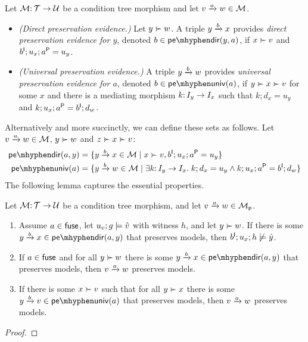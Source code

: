 \begin{definition}\label{def:preservation evidence}
Let ${\mathcal{M}}{:}\, {\mathcal{T}}\rightarrow{\mathcal{U}}$ be a condition tree morphism and let $\trip vaw\in\cM$.
\begin{itemize}[topsep=\smallskipamount]
\item \emph{(Direct preservation evidence.)} Let $y\childof w$. A triple $\trip ybx$ provides \emph{direct preservation evidence for $y$}, denoted $b\in\pedir{y,a}$, if $x\childof v$ and $b^{\mathsf I};u_x;a^{\mathsf P}=u_y$.
\item \emph{(Universal preservation evidence.)} A triple $\trip ybw$ provides \emph{universal preservation evidence for $a$}, denoted $b\in\peuniv{a}$, if $y\childof x\childof v$ for some $x$ and there is a mediating morphism $k{:}\, I_y\rightarrow I_x$ such that $k;d_x=u_y$ and $k;u_x;a^{\mathsf P}=b^{\mathsf I};d_w$.
\end{itemize}
\end{definition}
%
Alternatively and more succinctly, we can define these sets as follows. Let $\trip vaw\in\cM$, $y\childof w$ and $z\childof x\childof v$:
%
\begin{align*}
\pedir{a,y} ={} & \gensetof{\trip ybx\in \cM}{x\childof v, b\I;u_x;a\P=u_y} \\
\peuniv{a} ={} & \gensetof{\trip ybw\in\cM}{\exists k\of I_y\to I_x\st k;d_x=u_y\wedge k;u_x;a\P=b\I;d_w}
\end{align*}
%
The following lemma captures the essential properties.
%
\begin{lemma}\label{lem:preservation evidence}
Let ${\mathcal{M}}{:}\, {\mathcal{T}}\rightarrow {\mathcal{U}}$ be a condition tree morphism, and let $\trip vaw\in \cM_\pgen$.
\begin{enumerate}[topsep=\itemsep]
\item Assume $a\in{\mathsf{fuse}}$, let $u_v;g\models \hat v$ with witness $h$, and let $y\childof w$. If there is some $\trip ybx\in \pedir{a,y}$ that preserves models, then $b^{\mathsf I};u_x;h\not\models \hat y$.
\item If $a\in {\mathsf{fuse}}$ and for all $y\childof w$ there is some $\trip ybx\in \pedir{a,y}$ that preserves models, then $\trip vaw$ preserves models.
\item If there is some $x\childof v$ such that for all $y\childof x$ there is some $\trip ybv\in\peuniv{a}$ that preserves models, then $\trip vaw$ preserves models.
\end{enumerate}
\end{lemma}
%
\begin{proof}
\end{proof}
